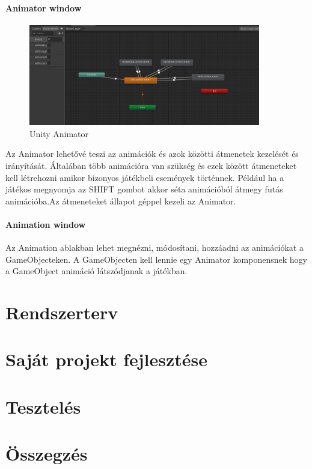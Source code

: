 \documentclass[
]{thesis-ekf}
\theoremstyle{definition}
\theoremstyle{remark}
\begin{document}
\subsubsection{Animator window}

\begin{figure}[h!]
	\centering
	\includegraphics[width=0.9\textwidth]{UnityAnimatorKep.png}
	\caption{Unity Animator}
	\label{fig:kep}
\end{figure}
Az Animator lehetővé teszi az animációk és azok közötti átmenetek kezelését és irányítását. Általában több animációra van szükség és ezek között átmeneteket kell létrehozni amikor bizonyos játékbeli események történnek. Például ha a játékos megnyomja az SHIFT gombot akkor séta animációból átmegy futás animációba.Az átmeneteket állapot géppel kezeli az Animator.

\subsubsection{Animation window}
Az Animation ablakban lehet megnézni, módosítani, hozzáadni az animációkat a GameObjecteken. A GameObjecten kell lennie egy Animator komponensnek hogy a GameObject animáció látszódjanak a játékban.

\chapter{Rendszerterv}


\chapter{Saját projekt fejlesztése}

\chapter{Tesztelés}

\chapter*{Összegzés}
\end{document}
